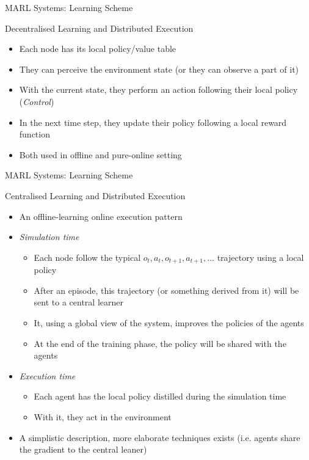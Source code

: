 \documentclass[presentation]{beamer}\mode<presentation>{\usetheme{AMSBolognaFC}}
\begin{document}
\begin{frame}{MARL Systems: Learning Scheme}
	
	\begin{exampleblock}{Decentralised Learning and Distributed Execution}
		\begin{itemize}
			\item Each node has its local policy/value table
			\item They can perceive the environment state (or they can observe a part of it)
			\item With the current state, they perform an action following their local policy (\emph{Control})
			\item In the next time step, they update their policy following a local reward function 
			\item Both used in offline and pure-online setting
		\end{itemize}
	\end{exampleblock}
\end{frame}
\begin{frame}{MARL Systems: Learning Scheme}
	
	\begin{exampleblock}{Centralised Learning and Distributed Execution}
		\begin{itemize}
			\item An offline-learning online execution pattern
			\item \emph{Simulation time}
			\begin{itemize}
				\item Each node follow the typical $o_t, a_t, o_{t+1}, a_{t+1},\dots $ trajectory using a local policy
				\item After an episode, this trajectory (or something derived from it) will be sent to a central learner
				\item It, using a global view of the system, improves the policies of the agents 
				\item At the end of the training phase, the policy will be shared with the agents
			\end{itemize} 
			\item \emph{Execution time}
				\begin{itemize}
					\item Each agent has the local policy distilled during the simulation time
					\item With it, they act in the environment
				\end{itemize}
			\item A simplistic description, more elaborate techniques exists (i.e. agents share the gradient to the central leaner)
		\end{itemize}
	\end{exampleblock}
\end{frame}
\end{document}
